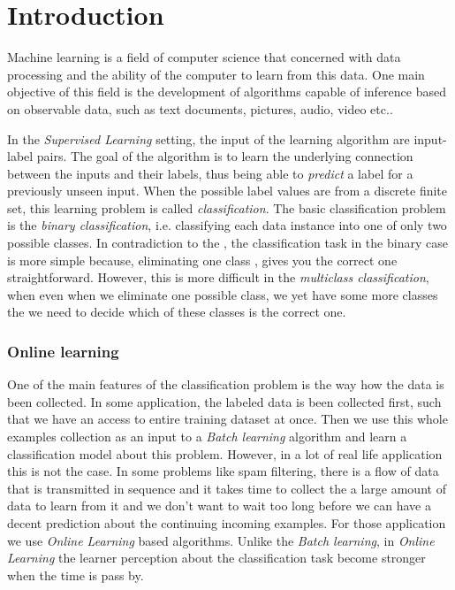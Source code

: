\chapter{Introduction}



Machine learning is a  field of computer science that concerned with data processing and the ability
of the computer to learn from this data. 
One main objective of this field is the development of algorithms capable of inference based on 
observable data, such as text documents, pictures, audio, video etc.. 
 
In the \textit{Supervised Learning} setting, the input of the learning algorithm are input-label pairs. 
The goal of the algorithm is to learn the underlying connection between the inputs and their labels, 
thus being able to \textit{predict} a label for a previously unseen input. 
When the possible label values are from a discrete finite set, this learning problem is called
 \textit{classification}. The basic classification problem is the \textit{binary classification}, i.e. classifying 
 each data instance into one of only two possible classes. In contradiction to 
 the , the classification task in the binary 
 case is more simple because, eliminating one class , gives you the correct one 
 straightforward. However, this is more difficult in the \textit{multiclass 
 classification}, when even when we eliminate one possible class, we yet have 
 some more classes the we need to decide which of these classes  is the correct one. 
 

\subsection{Online learning}

One of the main features of the classification problem is the way how the data is been collected. 
In some application, the labeled data is been collected first, such that we have an access to entire training
 dataset at once. Then we use this whole examples collection as an input to 
 a \textit{Batch learning} algorithm and learn a classification model about this problem. 
However, in a lot of real life application this is not the case. In some problems like spam filtering, there is
 a flow of data that is transmitted in sequence and it takes time to collect the a large amount of data to learn
 from it and we don't want to wait too long before we can have a decent prediction about the continuing
  incoming examples. For those application we use  
\textit{Online Learning} based algorithms.
Unlike the \textit{Batch learning}, in \textit{Online Learning} 
the learner perception about the classification task become stronger when the time is pass by.
 
